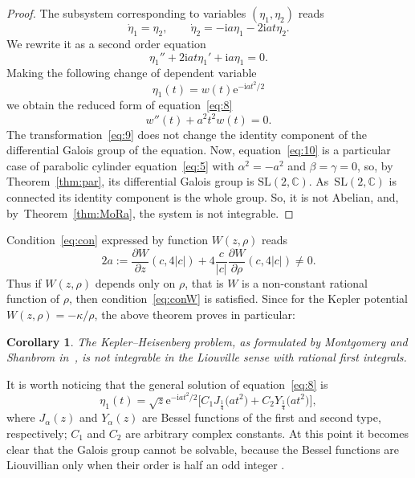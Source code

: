 \documentclass[pdftex]{sigma}
\newcommand\abs[1]{\lvert #1 \rvert}
\numberwithin{equation}{section}
\newtheorem{Corollary}[Theorem]{Corollary}
\begin{document}
\begin{proof}
 The subsystem corresponding to variables $(\eta_1,\eta_2)$ reads
 \begin{equation*}
 \dot\eta_1=\eta_2, \qquad \dot\eta_{2 }= -\mathrm{i}a\eta_1 -2 \mathrm{i}a t \eta_{2}.
 \end{equation*}
 We rewrite it as a second order equation
 \begin{equation}
 \label{eq:8}
 \eta_1'' +2 \mathrm{i}a t \eta_1' + \mathrm{i}a\eta_1=0.
 \end{equation}
 Making the following change of dependent variable
 \begin{equation}
 \label{eq:9}
 \eta_1(t) = w(t)\mathrm{e}^{-\mathrm{i}a t^2/2}
 \end{equation}
 we obtain the reduced form of equation~\eqref{eq:8}
 \begin{equation}
 \label{eq:10}
 w''(t) + a^2 t^2 w(t)=0.
 \end{equation}
 The transformation~\eqref{eq:9} does not change the identity
 component of the differential Galois group of the equation. Now,
 equation~\eqref{eq:10} is a particular case of parabolic cylinder
 equation~\eqref{eq:5} with $\alpha^2 = -a^2$ and $\beta=\gamma=0$,
 so, by Theorem~\ref{thm:par}, its differential Galois group is
 $\mathrm{SL}(2,\mathbb{C})$. As~$\mathrm{SL}(2,\mathbb{C})$ is
 connected its identity component is the whole group. So, it is not
 Abelian, and, by~Theorem~\ref{thm:MoRa}, the system is not
 integrable.
\end{proof}
Condition~\eqref{eq:con} expressed by function $W(z,\rho)$ reads
 \begin{equation}
 \label{eq:conW}
2a:= \frac{\partial W}{\partial z}(c,4\abs{c}) +
 {4}\frac{c}{\abs{c}}\frac{\partial W}{\partial \rho}(c,4\abs{c})\neq 0.
 \end{equation}
Thus if $W(z,\rho)$ depends only on $\rho$, that is $W$ is a
non-constant rational function of $\rho$, then
condition~\eqref{eq:conW} is satisfied. Since for the Kepler potential
$W(z,\rho)=-\kappa/\rho$, the above theorem proves in particular:
\begin{Corollary}
The Kepler--Heisenberg problem, as formulated by Montgomery and Shanbrom in~{\rm \cite{1}}, is not integrable in the Liouville sense with rational first integrals.
\end{Corollary}

\begin{Remark} %
 It is worth noticing that the general solution of
 equation~\eqref{eq:8} is
 \begin{equation*}
 \eta_1(t)= \sqrt{z} \mathrm{e}^{-\mathrm{i}a t^2/2}
 \Big[ C_1 J_{\frac{1}{4}} \big(a t^2\big) + C_2 Y_{\frac{1}{4}} \big(a t^2\big) \Big],
 \end{equation*}
 where $J_{\alpha}(z)$ and $Y_{\alpha}(z)$ are Bessel functions of
 the first and second type, respectively; $C_1$ and $C_2$ are
 arbitrary complex constants. At this point it becomes clear that the
 Galois group cannot be solvable, because the Bessel functions are
 Liouvillian only when their order is half an odd integer \cite{3}.
\end{Remark}
\end{document}

